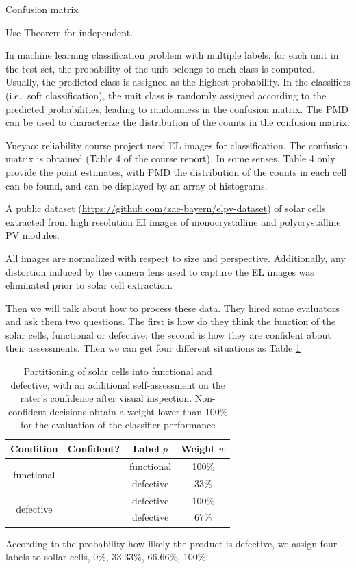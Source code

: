 \documentclass[12pt]{article}
\newcommand{\cmark}{\ding{51}}%
\newcommand{\xmark}{\ding{55}}%
\begin{document}
Confusion matrix

Use Theorem for independent.

In machine learning classification problem with multiple labels, for each unit in the test set, the probability of the unit belongs to each class is computed. Usually, the predicted class is assigned as the highest probability. In the classifiers (i.e., soft classification), the unit class is randomly assigned according to the predicted probabilities, leading to randomness in the confusion matrix. The PMD can be used to characterize the distribution of the counts in the confusion matrix. 



Yueyao: reliability course project used EL images for classification. The confusion matrix is obtained (Table 4 of the course report). In some senses, Table 4 only provide the point estimates, with PMD the distribution of the counts in each cell can be found, and can be displayed by an array of histograms. 


A public dataset (\url{https://github.com/zae-bayern/elpv-dataset}) of solar cells extracted from high resolution EI images of monocrystalline and polycrystalline PV modules.


All images are normalized with respect to size and perspective. Additionally, any distortion induced by the camera lens used to capture the EL images was eliminated prior to solar cell extraction.

Then we will talk about how to process these data. They hired some evaluators and ask them two questions. The first is how do they think the function of the solar cells, functional or defective; the second is how they are confident about their assessments. Then we can get four different situations as Table \ref{tt}

\begin{table}[h!]
	\centering
	\caption{Partitioning of solar cells into functional and defective, with an additional self-assessment on the rater's confidence after visual inspection. Non-confident decisions obtain a weight lower than 100\% for the evaluation of the classifier performance }
	\begin{tabular}{c|c|c|c}
		\hline
		\hline
		Condition  & Confident?  &  Label $p$ & Weight $w$ \\
		\hline
		\multirow{2}{*}{functional} & \cmark & functional & 100\% \\
		& \xmark& defective  & 33\% \\
		\hline
		\multirow{2}{*}{defective} & \cmark & defective & 100\%  \\
		& \xmark & defective & 67\% \\
		\hline
		\hline
	\end{tabular}
	
	
	
	\label{tt}
	
\end{table}
According to the probability how likely the product is defective, we assign four labels to sollar cells, 0\%, 33.33\%, 66.66\%, 100\%.
\end{document}
